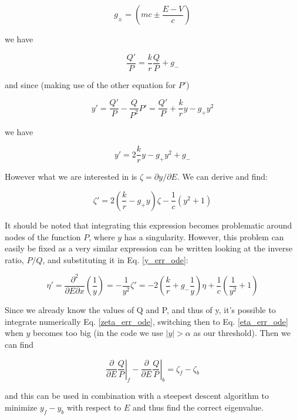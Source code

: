 \documentclass[]{report}
\begin{document}
\begin{equation}
g_\pm = \left(mc\pm\frac{E-V}{c}\right)
\end{equation}

we have

\begin{equation}
\frac{Q'}{P} = \frac{k}{r}\frac{Q}{P}+g_-
\end{equation}

and since (making use of the other equation for $P'$)

\begin{equation}
y' = \frac{Q'}{P} - \frac{Q}{P^2}P' = \frac{Q'}{P} + \frac{k}{r} y -g_+y^2
\end{equation}

we have

\begin{equation}\label{y_err_ode}
y' = 2\frac{k}{r}y-g_+y^2+g_-
\end{equation}

However what we are interested in is $\zeta = \partial y / \partial E$. We can derive and find:

\begin{equation}\label{zeta_err_ode}
\zeta' = 2\left(\frac{k}{r}-g_+y\right)\zeta-\frac{1}{c}(y^2+1)
\end{equation}

It should be noted that integrating this expression becomes problematic around nodes of the function $P$, where $y$ has a singularity. However, this problem can easily be fixed as a very similar expression can be written looking at the inverse ratio, $P/Q$, and substituting it in Eq. \ref{y_err_ode}:

\begin{equation}\label{eta_err_ode}
\eta' =\frac{\partial^2}{\partial E\partial x}\left(\frac{1}{y}\right) = -\frac{1}{y^2}\zeta' = -2\left(\frac{k}{r}+g_-\frac{1}{y}\right)\eta+\frac{1}{c}(\frac{1}{y^2}+1)
\end{equation}

Since we already know the values of Q and P, and thus of y, it's possible to integrate numerically Eq. \ref{zeta_err_ode}, switching then to Eq. \ref{eta_err_ode} when $y$ becomes too big (in the code we use $|y|>\alpha$ as our threshold). Then we can find

\begin{equation}
\frac{\partial}{\partial E}\left. \frac{Q}{P}\right|_f - \frac{\partial}{\partial E}\left. \frac{Q}{P}\right|_b = \zeta_f-\zeta_b
\end{equation}

and this can be used in combination with a steepest descent algorithm to minimize $y_f-y_b$ with respect to $E$ and thus find the correct eigenvalue.




\end{document}
